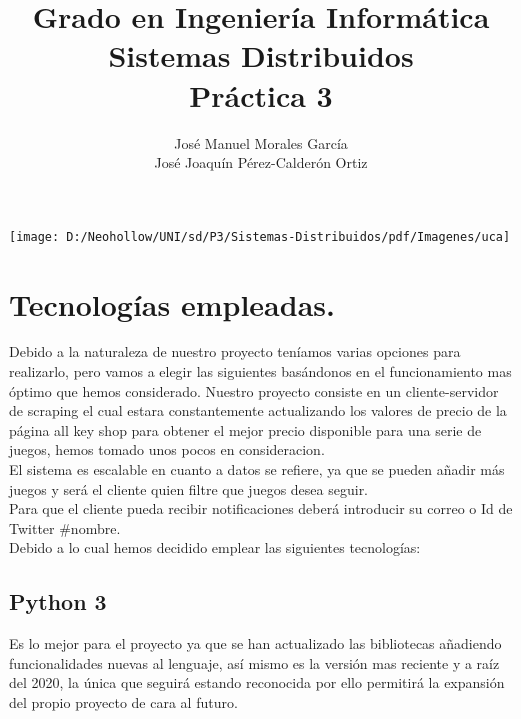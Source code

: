 \documentclass[12pt,letterpaper]{article}
\title{Grado en Ingeniería Informática\\Sistemas Distribuidos\\Práctica 3}
\author{José Manuel Morales García \\ José Joaquín Pérez-Calderón Ortiz}
\begin{document}
	\maketitle
	\begin{center}
		\texttt{[image: D:/Neohollow/UNI/sd/P3/Sistemas-Distribuidos/pdf/Imagenes/uca]}
	\end{center}
	
	\thispagestyle{empty}
	\newpage
	\tableofcontents
	\newpage
	
	
	
	
	\lstset{language=bash, numbers=left, numberstyle=\tiny, numbersep=10pt, firstnumber=1, stepnumber=1}
		\section{Tecnologías empleadas.}
			Debido a la naturaleza de nuestro proyecto teníamos varias opciones para realizarlo, pero vamos a elegir las siguientes basándonos en el funcionamiento mas óptimo que hemos considerado. Nuestro proyecto consiste en un  cliente-servidor de scraping el cual estara constantemente actualizando los valores de precio de la página all key shop para obtener el mejor precio disponible para una serie de juegos, hemos tomado unos pocos en consideracion.\\
			 
			\noindent El sistema es escalable en cuanto a datos se refiere, ya que se pueden añadir más juegos y será el cliente quien filtre que juegos desea seguir.\\
			
			\noindent Para que el cliente pueda recibir notificaciones deberá introducir su correo o Id de Twitter \#nombre.\\
			
			\noindent Debido a lo cual hemos decidido emplear las siguientes tecnologías:
			\subsection{Python 3}
				Es lo mejor para el proyecto ya que se han actualizado las bibliotecas añadiendo funcionalidades nuevas al lenguaje, así mismo es la versión mas reciente y a raíz del 2020, la única que seguirá estando reconocida por ello permitirá la expansión del propio proyecto de cara al futuro.\\
\end{document}
